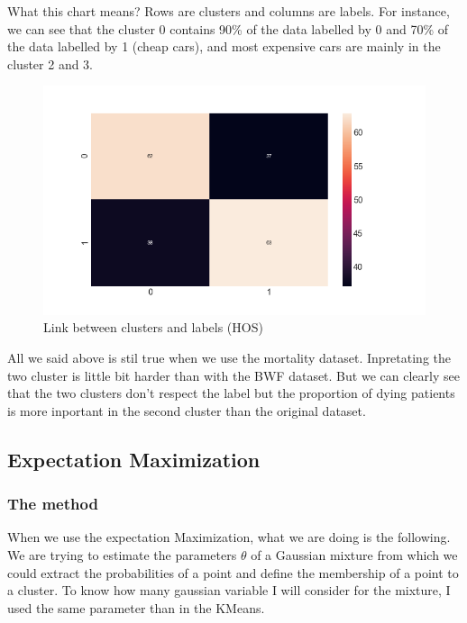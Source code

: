 \documentclass[15pt]{article}
\begin{document}
\begin{multicols}{2}
What this chart means? Rows are clusters and columns are labels. For instance, we can see that the cluster 0 contains 90\% of the data labelled by 0 and 70\% of the data labelled by 1 (cheap cars), and most expensive cars are mainly in the cluster 2 and 3.

\begin{figure}[H]
\centering
\includegraphics[width = \columnwidth]{grhoskm.png}
\caption{Link between clusters and labels (HOS)}
\end{figure}

All we said above is stil true when we use the mortality dataset. Inpretating the two cluster is little bit harder than with the BWF dataset. But we can clearly see that the two clusters don't respect the label but the proportion of dying patients is more inportant in the second cluster than the original dataset.



\subsection{Expectation Maximization}

\subsubsection{The method}

When we use the expectation Maximization, what we are doing is the following. We are trying to estimate the parameters $\theta$ of a Gaussian mixture from which we could extract the probabilities of a point and define the membership of a point to a cluster. To know how many gaussian variable I will consider for the mixture, I used the same parameter than in the KMeans.


\end{multicols}
\end{document}
